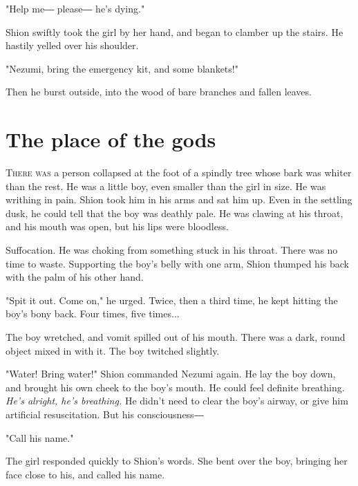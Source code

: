"Help me― please― he's dying."

Shion swiftly took the girl by her hand, and began to clamber up the
stairs. He hastily yelled over his shoulder.

"Nezumi, bring the emergency kit, and some blankets!"

Then he burst outside, into the wood of bare branches and fallen leaves.

\chapter{The place of the gods}


\lettrine{T}{here was} a person collapsed at the foot of a spindly tree whose bark
was whiter than the rest. He was a little boy, even smaller than the
girl in size. He was writhing in pain. Shion took him in his arms and
sat him up. Even in the settling dusk, he could tell that the boy was
deathly pale. He was clawing at his throat, and his mouth was open, but
his lips were bloodless.

\myspace

Suffocation. He was choking from something stuck in his throat. There
was no time to waste. Supporting the boy's belly with one arm, Shion
thumped his back with the palm of his other hand.

"Spit it out. Come on," he urged. Twice, then a third time, he kept
hitting the boy's bony back. Four times, five times...

The boy wretched, and vomit spilled out of his mouth. There was a dark,
round object mixed in with it. The boy twitched slightly.

"Water! Bring water!" Shion commanded Nezumi again. He lay the boy down,
and brought his own cheek to the boy's mouth. He could feel definite
breathing. \emph{He's alright, he's breathing.} He didn't need to clear the
boy's airway, or give him artificial resuscitation. But his
consciousness―

"Call his name."

The girl responded quickly to Shion's words. She bent over the boy,
bringing her face close to his, and called his name.

